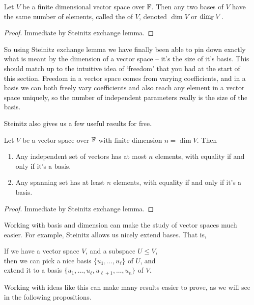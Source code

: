 \documentclass[a4paper]{scrartcl}
\begin{document}
\begin{corollary}[Dimension]
    Let $V$ be a finite dimensional vector space over $\mathbb{F}$. Then any two bases of $V$ have the same number of elements, called the  of $V$, denoted $\dim V$ or $\dim_{\mathbb{F}} V$.
\end{corollary}
\begin{proof}
    Immediate by Steinitz exchange lemma.
\end{proof}

So using Steinitz exchange lemma we have finally been able to pin down exactly what is meant by the dimension of a vector space -- it's the size of it's basis.
This should match up to the intuitive idea of `freedom' that you had at the start of this section. Freedom in a vector space comes from varying coefficients, and in a basis we can both freely vary coefficients and also reach any element in a vector space uniquely, so the number of independent parameters really is the size of the basis.

Steinitz also gives us a few useful results for free.

\begin{corollary}
    Let $V$ be a vector space over $\mathbb{F}$ with finite dimension $n = \dim V$. Then
    \begin{enumerate}[label=(\roman*)]
        \item Any independent set of vectors has at most $n$ elements, with equality if and only if it's a basis.
        \item Any spanning set has at least $n$ elements, with equality if and only if it's a basis.
    \end{enumerate} 
\end{corollary}
\begin{proof}
    Immediate by Steinitz exchange lemma.
\end{proof}

Working with basis and dimension can make the study of vector spaces much easier. For example, Steinitz allows us nicely extend bases. That is,
\begin{center}
	\color{blue}
    If we have a vector space $V$, and a subspace $U \leq V$, \\then we can pick a nice basis $\{u_1, \dots, u_\ell\}$ of $U$, and \\extend it to a basis $\{u_1, \dots, u_{\ell}, u_{\ell + 1}, \dots, u_n\}$ of $V$.
\end{center}Working with ideas like this can make many results easier to prove, as we will see in the following propositions.
\end{document}
